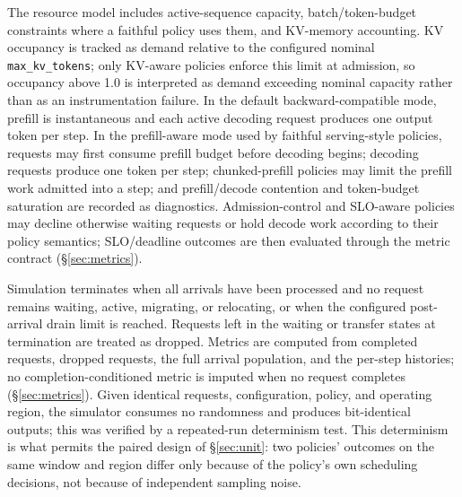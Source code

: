 The resource model includes active-sequence capacity, batch/token-budget
constraints where a faithful policy uses them, and KV-memory accounting.
KV occupancy is tracked as demand relative to the configured nominal
\texttt{max\_kv\_tokens}; only KV-aware policies enforce this limit at
admission, so occupancy above 1.0 is interpreted as demand exceeding nominal
capacity rather than as an instrumentation failure. In the default
backward-compatible mode, prefill is instantaneous and each active decoding
request produces one output token per step. In the prefill-aware mode used
by faithful serving-style policies, requests may first consume prefill
budget before decoding begins; decoding requests produce one token per step;
chunked-prefill policies may limit the prefill work admitted into a step;
and prefill/decode contention and token-budget saturation are recorded as
diagnostics. Admission-control and SLO-aware policies may decline otherwise
waiting requests or hold decode work according to their policy semantics;
SLO/deadline outcomes are then evaluated through the metric contract
(\S\ref{sec:metrics}).

Simulation terminates when all arrivals have been processed and no request
remains waiting, active, migrating, or relocating, or when the configured
post-arrival drain limit is reached. Requests left in the waiting or
transfer states at termination are treated as dropped. Metrics are computed
from completed requests, dropped requests, the full arrival population, and
the per-step histories; no completion-conditioned metric is imputed when no
request completes (\S\ref{sec:metrics}). Given identical requests,
configuration, policy, and operating region, the simulator consumes no
randomness and produces bit-identical outputs; this was verified by a
repeated-run determinism test. This determinism is what permits the paired
design of \S\ref{sec:unit}: two policies' outcomes on the same window and
region differ only because of the policy's own scheduling decisions, not
because of independent sampling noise.

